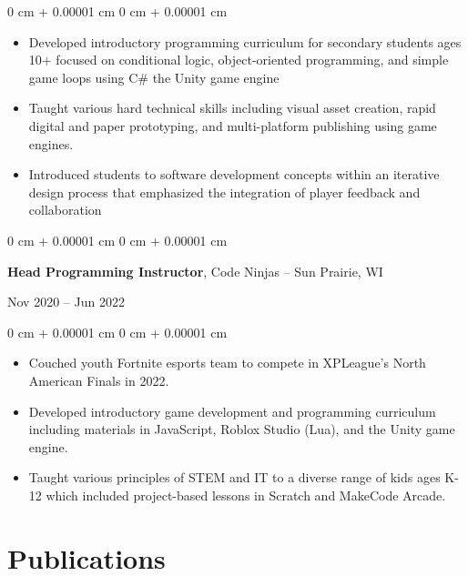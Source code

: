 \documentclass[10pt, letterpaper]{article}
\newenvironment{highlights}{
    \begin{itemize}[
        topsep=0.10 cm,
        parsep=0.10 cm,
        partopsep=0pt,
        itemsep=0pt,
        leftmargin=0 cm + 10pt
    ]
}{
    \end{itemize}
} %
\newenvironment{onecolentry}{
    \begin{adjustwidth}{
        0 cm + 0.00001 cm
    }{
        0 cm + 0.00001 cm
    }
}{
    \end{adjustwidth}
} %
\newenvironment{twocolentry}[2][]{
    \onecolentry
    \def\secondColumn{#2}
    \setcolumnwidth{\fill, 4.5 cm}
    \begin{paracol}{2}
}{
    \switchcolumn \raggedleft \secondColumn
    \end{paracol}
    \endonecolentry
} %
\begin{document}
        \vspace{0.10 cm}
        \begin{onecolentry}
            \begin{highlights}
                \item Developed introductory programming curriculum for secondary students ages 10+ focused on conditional logic, object-oriented programming, and simple game loops using C\# the Unity game engine
                \item Taught various hard technical skills including visual asset creation, rapid digital and paper prototyping, and multi-platform publishing using game engines.
                \item Introduced students to software development concepts within an iterative design process that emphasized the integration of player feedback and collaboration
            \end{highlights}
        \end{onecolentry}

        \vspace{0.2 cm}

        \begin{twocolentry}{
            Nov 2020 – Jun 2022
        }
            \textbf{Head Programming Instructor}, Code Ninjas -- Sun Prairie, WI
        \end{twocolentry}

        \vspace{0.10 cm}
        \begin{onecolentry}
            \begin{highlights}
                \item Couched youth Fortnite esports team to compete in XPLeague’s North American Finals in 2022.
                \item Developed introductory game development and programming curriculum including materials in JavaScript, Roblox Studio (Lua), and the Unity game engine.
                \item Taught various principles of STEM and IT to a diverse range of kids ages K-12 which included project-based lessons in Scratch and MakeCode Arcade.
            \end{highlights}
        \end{onecolentry}

    \pagebreak
    \section{Publications}
        
\end{document}
